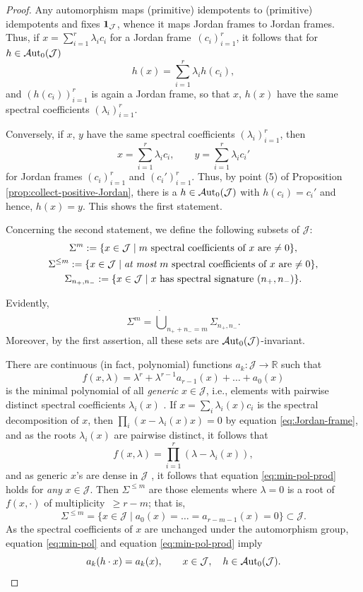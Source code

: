 \documentclass[10pt,a4paper]{amsart}
\numberwithin{equation}{section}
\newcommand{\be}{\begin{equation}}
\newcommand{\ee}{\end{equation}}
\newcommand{\Aut}{\mathcal{A}{\rm ut}}
\newcommand{\Jcal}{\mathcal{J}}
\newcommand{\R}{{\mathbb R}}
\begin{document}
\begin{proof}
Any automorphism maps (primitive) idempotents to (primitive) idempotents and fixes ${\bf 1}_\Jcal$, whence it maps Jordan frames to Jordan frames. Thus, if $x = \sum_{i=1}^r \lambda_i c_i$ for a Jordan frame~$(c_i)_{i=1}^r$, it follows that for $h \in \Aut_0(\Jcal)$
\[
h(x) = \sum_{i=1}^r \lambda_i h(c_i),
\]
and $(h(c_i))_{i=1}^r$ is again a Jordan frame, so that $x$, $h(x)$ have the same spectral coefficients $(\lambda_i)_{i=1}^r$.

Conversely, if $x$, $y$ have the same spectral coefficients $(\lambda_i)_{i=1}^r$, then
\[
x = \sum_{i=1}^r \lambda_i c_i, \qquad y = \sum_{i=1}^r \lambda_i c_i'
\]
for Jordan frames $(c_i)_{i=1}^r$ and $(c_i')_{i=1}^r$. Thus, by point (5) of Proposition \ref{prop:collect-positive-Jordan}, there is a $h \in \Aut_0(\Jcal)$ with $h(c_i) = c_i'$ and hence, $h(x) = y$. This shows the first statement.

Concerning the second statement, we define the following subsets of $\Jcal$:
\begin{gather*}
\Sigma^m := \{x \in \Jcal \mid \text{$m$ spectral coefficients of $x$ are $\neq 0$}\},\\
\Sigma^{\leq m} := \{x \in \Jcal \mid \text{{\em at most} $m$ spectral coefficients of $x$ are $\neq 0$}\},\\
\Sigma_{n_+, n_-} := \{x \in \Jcal \mid \text{$x$ has spectral signature $(n_+, n_-)$}\}.
\end{gather*}

Evidently,
\be \label{eq:decomp-Sigma_m}
\Sigma^m = \dot \bigcup_{n_++n_- = m} \Sigma_{n_+,n_-}.
\ee
Moreover, by the first assertion, all these sets are $\Aut_0(\Jcal)$-invariant.

There are continuous (in fact, polynomial) functions $a_k\colon \Jcal \to \R$ such that
\be \label{eq:min-pol}
f(x, \lambda) = \lambda^r + \lambda^{r-1} a_{r-1}(x) + \dots + a_0(x)
\ee
is the minimal polynomial of all {\em generic }$x \in \Jcal$, i.e., elements with pairwise distinct spectral coefficients $\lambda_i(x)$ \cite[Proposition II.2.1]{F-K-1994}.
If $x = \sum_i \lambda_i(x) c_i$ is the spectral decomposition of $x$, then $\prod_i(x - \lambda_i(x) x) = 0$ by equation \eqref{eq:Jordan-frame}, and as the roots $\lambda_i(x)$ are pairwise distinct, it follows that
\be \label{eq:min-pol-prod}
f(x, \lambda) = \prod_{i=1}^r (\lambda - \lambda_i(x)),
\ee
and as generic $x$'s are dense in $\Jcal$ \cite[Proposition II.2.1]{F-K-1994}, it follows that equation \eqref{eq:min-pol-prod} holds for {\em any }$x \in \Jcal$. Then $\Sigma^{\leq m}$ are those elements where $\lambda = 0$ is a root of $f(x, \cdot)$ of multiplicity~$\geq r-m$; that is,
\be \label{Sigma-minimal}
\Sigma^{\leq m} = \{x \in \Jcal \mid a_0(x) = \dots = a_{r-m-1}(x) = 0\} \subset \Jcal.
\ee
As the spectral coefficients of $x$ are unchanged under the automorphism group, equation \eqref{eq:min-pol} and equation \eqref{eq:min-pol-prod} imply
\be \label{eq:a_k-invariant}
a_k(h \cdot x) = a_k(x), \qquad x \in \Jcal, \quad h \in \Aut_0(\Jcal).
\ee


\end{proof}
\end{document}
